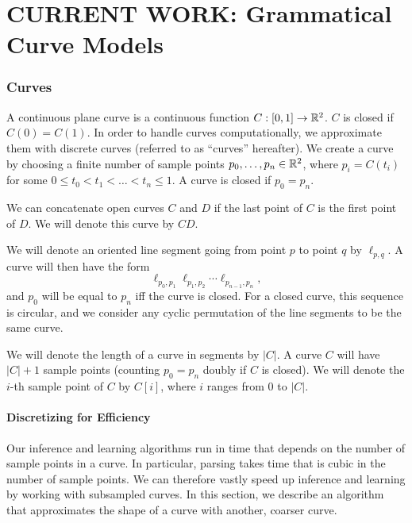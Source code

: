 \documentclass{article}
\begin{document}
\part{CURRENT WORK: Grammatical Curve Models}

\section{Curves}

A continuous plane curve is a continuous function $C:[0,1]\to
\mathbb{R}^2$. $C$ is closed if $C(0) = C(1)$. In order to handle curves
computationally, we approximate them with discrete curves (referred to
as ``curves'' hereafter). We create a curve by choosing a finite
number of sample points $p_0,\dots,p_n\in \mathbb{R}^2$, where $p_i =
C(t_i)$ for some $0\le t_0 < t_1 < \ldots < t_n \le 1$. A curve is
closed if $p_0 = p_n$.

We can concatenate open curves $C$ and $D$ if the last point of $C$ is
the first point of $D$. We will denote this curve by $CD$. 

We will denote an oriented line segment going from point $p$ to point
$q$ by $\ell_{p,q}$. A curve will then have the form
$$ \ell_{p_0,p_1} \ell_{p_1,p_2}\cdots \ell_{p_{n-1},p_n},$$ and
$p_0$ will be equal to $p_n$ iff the curve is closed. For a closed
curve, this sequence is circular, and we consider any cyclic
permutation of the line segments to be the same curve.

We will denote the length of a curve in segments by $|C|$. A curve $C$
will have $|C|+1$ sample points (counting $p_0 = p_n$ doubly if $C$ is
closed). We will denote the $i$-th sample point of $C$ by $C[i]$,
where $i$ ranges from $0$ to $|C|$.


\subsection{Discretizing for Efficiency}

Our inference and learning algorithms run in time that depends on the
number of sample points in a curve. In particular, parsing takes time
that is cubic in the number of sample points. We can therefore vastly
speed up inference and learning by working with subsampled curves. In
this section, we describe an algorithm that approximates the shape of
a curve with another, coarser curve. 
\end{document}
